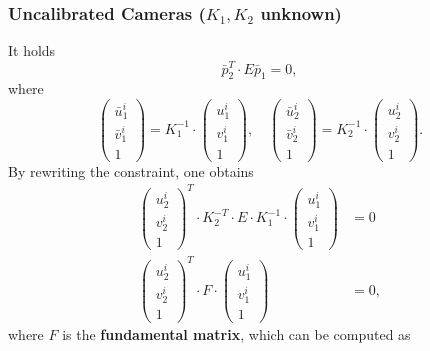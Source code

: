 \documentclass[a4paper,12 pt]{article}
\theoremstyle{definition}
\theoremstyle{remark}
\theoremstyle{definition}
\theoremstyle{definition}
\theoremstyle{definition}
\theoremstyle{remark}
\theoremstyle{definition}
\begin{document}
\subsubsection*{Uncalibrated Cameras ($K_1,K_2$ unknown)}
It holds 
\begin{equation}
\bar{p}_2^T\cdot E \bar{p}_1=0,
\end{equation}
where 
\begin{equation}
\begin{pmatrix}
\bar{u}_1^i\\
\bar{v}_1^i\\
1
\end{pmatrix}=K_1^{-1}\cdot \begin{pmatrix}
u_1^i\\
v_1^i\\
1
\end{pmatrix},\quad \begin{pmatrix}
\bar{u}_2^i\\
\bar{v}_2^i\\
1
\end{pmatrix}=K_2^{-1}\cdot \begin{pmatrix}
u_2^i\\
v_2^i\\
1
\end{pmatrix}.
\end{equation}
By rewriting the constraint, one obtains
\begin{equation}
\begin{split}
\begin{pmatrix}
u_2^i\\
v_2^i\\
1
\end{pmatrix}^T\cdot K_2^{-T}\cdot E \cdot K_1^{-1}\cdot \begin{pmatrix}
u_1^i\\
v_1^i\\
1
\end{pmatrix}&=0\\
\begin{pmatrix}
u_2^i\\
v_2^i\\
1
\end{pmatrix}^{T}\cdot F \cdot \begin{pmatrix}
u_1^i\\
v_1^i\\
1
\end{pmatrix}&=0,
\end{split}
\end{equation}
where $F$ is the \textbf{fundamental matrix}, which can be computed as
\end{document}
